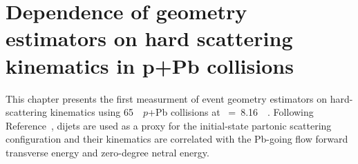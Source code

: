 \section{Dependence of geometry estimators on hard scattering kinematics in p+Pb collisions}
\label{ch:pPb}

This chapter presents the first measurment of event geometry estimators on hard-scattering kinematics using 65~\NB\ $p$+Pb collisions at \SNN~=~8.16~\TeV~\cite{HION-2024-11}.
Following Reference~\cite{HION-2023-05}, dijets are used as a proxy for the initial-state partonic scattering configuration and their kinematics are correlated with the Pb-going flow forward transverse energy and zero-degree netral energy.







